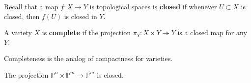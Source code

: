 \begin{definition}

Recall that a map \(f:X\to Y\) is topological spaces is \textbf{closed}
if whenever \(U \subset X\) is closed, then \(f(U)\) is closed in \(Y\).

\end{definition}

\begin{definition}

A variety \(X\) is \textbf{complete} if the projection
\(\pi_Y: X\times Y \twoheadrightarrow Y\) is a closed map for any \(Y\).

\end{definition}

\begin{slogan}

Completeness is the analog of compactness for varieties.

\end{slogan}

\begin{proposition}

The projection
\({\mathbb{P}}^n \times{\mathbb{P}}^m \to {\mathbb{P}}^m\) is closed.

\end{proposition}

